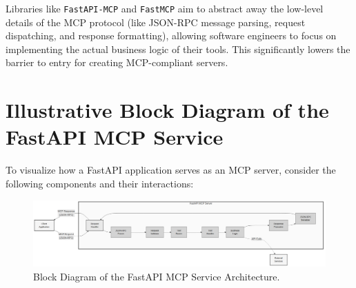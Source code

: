 Libraries like \texttt{FastAPI-MCP} and \texttt{FastMCP} aim to abstract away the low-level details of the MCP protocol 
(like JSON-RPC message parsing, request dispatching, and response formatting), allowing software engineers to focus on implementing 
the actual business logic of their tools. This significantly lowers the barrier to entry for creating MCP-compliant servers.

\section{Illustrative Block Diagram of the FastAPI MCP Service}
To visualize how a FastAPI application serves as an MCP server, consider the following components and their interactions:
\begin{figure}[htbp]
    \centering
    \includegraphics[width=\textwidth]{diagrams/mcp_server_diagram.png}
    \caption{Block Diagram of the FastAPI MCP Service Architecture.}
    \label{fig:mcp_server_diagram}
\end{figure}
